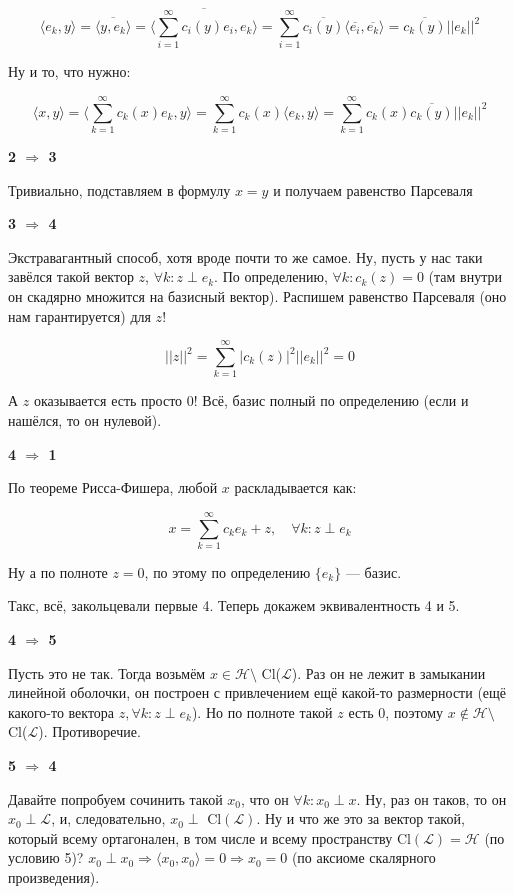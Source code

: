 \documentclass{article}
\def\sk#1#2{\langle #1, #2 \rangle}
\begin{document}
\[\sk{e_k}{y} = \overline{\sk{y}{e_k}} = \overline{\sk{\sum_{i = 1}^{\infty} c_i(y)e_i}{e_k}} = \sum_{i = 1}^{\infty}\overline{c_i(y)}\sk{\overline{e_i}}{\overline{e_k}} = \overline{c_k(y)}||e_k||^2\]

Ну и то, что нужно:

\[\sk{x}{y} = \sk{\sum_{k = 1}^{\infty} c_k(x)e_k}{y} = \sum_{k = 1}^{\infty} c_k(x)\sk{e_k}{y} = \sum_{k = 1}^{\infty} c_k(x) \overline{c_k(y)}||e_k||^2\]

\textbf{2 $\Rightarrow$ 3}

Тривиально, подставляем в формулу $x = y$ и получаем равенство Парсеваля

\textbf{3 $\Rightarrow$ 4}

Экстравагантный способ, хотя вроде почти то же самое. Ну, пусть у нас таки завёлся такой вектор $z$, $\forall k : z \perp e_k$. По определению, $\forall k: c_k(z) = 0$ (там внутри он скадярно множится на базисный вектор). Распишем равенство Парсеваля (оно нам гарантируется) для $z$!

\[||z||^2 = \sum_{k = 1}^{\infty} |c_k(z)|^2 ||e_k||^2 = 0\]

А $z$ оказывается есть просто 0! Всё, базис полный по определению (если и нашёлся, то он нулевой).

\textbf{4 $\Rightarrow$ 1}

По теореме Рисса-Фишера, любой $x$ раскладывается как:

\[x = \sum_{k = 1}^{\infty} c_k e_k + z, \quad \forall k: z \perp e_k\]

Ну а по полноте $z = 0$, по этому по определению $\{e_k\}$ --- базис.


Такс, всё, закольцевали первые 4. Теперь докажем эквивалентность 4 и 5.

\textbf{4 $\Rightarrow$ 5}

Пусть это не так. Тогда возьмём $x \in \mathcal{H} \setminus $ Cl($\mathcal{L}$). Раз он не лежит в замыкании линейной оболочки, он построен с привлечением ещё какой-то размерности (ещё какого-то вектора $z, \forall k : z \perp e_k$). Но по полноте такой $z$ есть 0, поэтому $x \notin \mathcal{H} \setminus $ Cl($\mathcal{L}$). Противоречие.

\textbf{5 $\Rightarrow$ 4}

Давайте попробуем сочинить такой $x_0$, что он $\forall k: x_0 \perp x$. Ну, раз он таков, то он $x_0 \perp \mathcal{L}$, и, следовательно, $x_0 \perp$ Cl$(\mathcal{L})$. Ну и что же это за вектор такой, который всему ортагонален, в том числе и всему пространству Cl$(\mathcal{L}) = \mathcal{H}$ (по условию 5)? $x_0 \perp x_0 \Rightarrow \sk{x_0}{x_0} = 0 \Rightarrow x_0 = 0$ (по аксиоме скалярного произведения).
\end{document}
